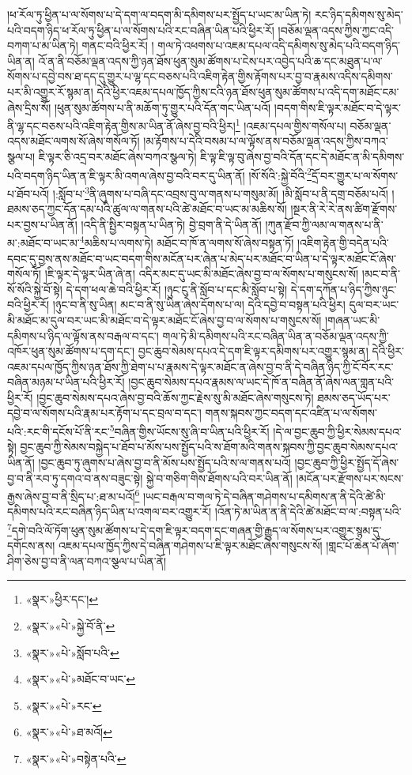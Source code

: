 །ཕ་རོལ་ཏུ་ཕྱིན་པ་ལ་སོགས་པ་དེ་དག་ལ་བདག་མི་དམིགས་པར་སྤྱོད་པ་ཡང་མ་ཡིན་ཏེ། རང་ཉིད་དམིགས་སུ་མེད་པའི་བདག་ཉིད་ཕ་རོལ་ཏུ་ཕྱིན་པ་ལ་སོགས་པའི་རང་བཞིན་ཡིན་པའི་ཕྱིར་རོ། །བཅོམ་ལྡན་འདས་ཀྱིས་ཀྱང་འདི་བཀག་པ་མ་ཡིན་ཏེ། གནང་བའི་ཕྱིར་རོ། །
གལ་ཏེ་འཕགས་པ་འཇམ་དཔལ་འདི་དམིགས་སུ་མེད་པའི་བདག་ཉིད་ཡིན་ན། འོ་ན་ནི་བཅོམ་ལྡན་འདས་ཀྱི་ཉན་ཐོས་ཕུན་སུམ་ཚོགས་པ་ངེས་པར་འབྱེད་པའི་ཆ་དང་མཐུན་པ་ལ་སོགས་པ་དབྱེ་བས་ཐ་དད་དུ་གྱུར་པ་ལྷ་དང་བཅས་པའི་འཇིག་རྟེན་གྱིས་རྟོགས་པར་བྱ་བ་རྣམས་འདིས་དམིགས་པར་མི་འགྱུར་རོ་སྙམ་ན། དེའི་ཕྱིར་འཇམ་དཔལ་ཁྱོད་ཀྱིས་ངའི་ཉན་ཐོས་ཕུན་སུམ་ཚོགས་པ་འདི་དག་མཐོང་ངམ་ཞེས་དྲིས་སོ། །ཕུན་སུམ་ཚོགས་པ་ནི་མཆོག་ཏུ་གྱུར་པའི་དོན་གང་ཡིན་པའོ། །བདག་གིས་ཇི་ལྟར་མཐོང་བ་དེ་ལྟར་ནི་ལྷ་དང་བཅས་པའི་འཇིག་རྟེན་གྱིས་མ་ཡིན་ནོ་ཞེས་བྱ་བའི་ཕྱིར།\footnote{«སྣར་»ཕྱིར་དང་།} །འཇམ་དཔལ་གྱིས་གསོལ་པ། བཅོམ་ལྡན་འདས་མཐོང་ལགས་སོ་ཞེས་གསོལ་ཏོ། །མ་རྟོགས་པ་དེའི་བསམ་པ་ལ་ལྟོས་ནས་བཅོམ་ལྡན་འདས་ཀྱིས་བཀའ་སྩལ་པ། ཇི་ལྟར་ཅི་འདྲ་བར་མཐོང་ཞེས་བཀའ་སྩལ་ཏེ། ཇི་ལྟ་ཇི་ལྟ་བུ་ཞེས་བྱ་བའི་དོན་དང་དེ་མཐོང་ན་མི་དམིགས་པའི་བདག་ཉིད་ཡིན་ན་ཇི་ལྟར་མི་འགལ་ཞེས་བྱ་བའི་བར་དུ་ཡིན་ནོ། །སོ་སོའི་:སྐྱེ་བོའི་\footnote{«སྣར་»«པེ་»སྐྱེ་བོ་ནི་}དྲོ་བར་གྱུར་པ་ལ་སོགས་པ་ཐོབ་པའོ། །:སློབ་པ་\footnote{«སྣར་»«པེ་»སློབ་པའི་}ནི་ཞུགས་པ་བཞི་དང་འབྲས་བུ་ལ་གནས་པ་གསུམ་མོ། །མི་སློབ་པ་ནི་དགྲ་བཅོམ་པའོ། །ཐམས་ཅད་ཀྱང་དོན་དམ་པའི་ཚུལ་ལ་གནས་པའི་ཚེ་མཐོང་བ་ཡང་མ་མཆིས་སོ། །སྔར་ནི་རེ་རེ་ནས་ཚིག་རྫོགས་པར་བྱས་པ་ཡིན་ནོ། །འདི་ནི་སྤྱིར་བསྟན་པ་ཡིན་ཏེ། བྱེ་བྲག་ནི་དེ་ཡིན་ནོ། །ཀུན་རྫོབ་ཀྱི་ལམ་ལ་གནས་པ་ནི་མ་:མཐོང་བ་ཡང་མ་\footnote{«སྣར་»«པེ་»མཐོང་བ་ཡང་}མཆིས་པ་ལགས་ཏེ། མཐོང་བ་ཁོ་ན་ལགས་སོ་ཞེས་བསྟན་ཏོ། །འཇིག་རྟེན་གྱི་བདེན་པའི་དབང་དུ་བྱས་ནས་མཐོང་བ་ཡང་བདག་གིས་མངོན་པར་ཞེན་པ་མེད་པར་མཐོང་བ་ཡིན་པ་དེ་ལྟར་མཐོང་ངོ་ཞེས་གསོལ་ཏོ། །ཇི་ལྟར་དེ་ལྟར་ཡིན་ཞེ་ན། འདིར་མང་དུ་ཡང་མི་མཐོང་ཞེས་བྱ་བ་ལ་སོགས་པ་གསུངས་སོ། །མང་བ་ནི་སོ་སོའི་སྐྱེ་བོ་སྟེ། དེ་དག་ཕལ་ཆེ་བའི་ཕྱིར་རོ། །ཉུང་ངུ་ནི་སློབ་པ་དང་མི་སློབ་པ་སྟེ། དེ་དག་དཀོན་པ་ཉིད་ཀྱིས་ཉུང་བའི་ཕྱིར་རོ། །ཉུང་བ་ནི་སུ་ཡིན། མང་བ་ནི་སུ་ཡིན་ཞེས་དོགས་པ་ལ། དེའི་དབྱེ་བ་བསྟན་པའི་ཕྱིར། དུལ་བར་ཡང་མི་མཐོང་མ་དུལ་བར་ཡང་མི་མཐོང་བ་དེ་ལྟར་མཐོང་ངོ་ཞེས་བྱ་བ་ལ་སོགས་པ་གསུངས་སོ། །གཞན་ཡང་མི་དམིགས་པ་ཉིད་ལ་ལྟོས་ནས་བརྒལ་བ་དང་། གལ་ཏེ་མི་དམིགས་པའི་རང་བཞིན་ཡིན་ན་བཅོམ་ལྡན་འདས་ཀྱི་འཁོར་ཕུན་སུམ་ཚོགས་པ་དག་དང་། བྱང་ཆུབ་སེམས་དཔའ་དེ་དག་ཇི་ལྟར་དམིགས་པར་འགྱུར་སྙམ་ན། དེའི་ཕྱིར་འཇམ་དཔལ་ཁྱོད་ཀྱིས་ཉན་ཐོས་ཀྱི་ཐེག་པ་པ་རྣམས་དེ་ལྟར་མཐོང་ན་ཞེས་བྱ་བ་ནི་དེ་བཞིན་ཉིད་ཀྱི་ངོ་བོར་རང་བཞིན་མཉམ་པ་ཡིན་པའི་ཕྱིར་རོ། །བྱང་ཆུབ་སེམས་དཔའ་རྣམས་ལ་ཡང་དེ་ཁོ་ན་བཞིན་ནོ་ཞེས་ལན་གླན་པའི་ཕྱིར་རོ། །བྱང་ཆུབ་སེམས་དཔའ་ཞེས་བྱ་བའི་ཆོས་ཀྱང་རྗེས་སུ་མི་མཐོང་ཞེས་གསུངས་ཏེ། ཐམས་ཅད་ཡོད་པར་དབྱེ་བ་ལ་སོགས་པའི་རྣམ་པར་རྟོག་པ་དང་བྲལ་བ་དང་། གནས་སྐབས་ཀྱང་བདག་དང་འཛིན་པ་ལ་སོགས་པའི་:རང་གི་དངོས་པོ་ནི་རང་\footnote{«སྣར་»«པེ་»རང་}བཞིན་གྱིས་ཡོངས་སུ་ཞི་བ་ཡིན་པའི་ཕྱིར་རོ། །དེ་ལ་བྱང་ཆུབ་ཀྱི་ཕྱིར་སེམས་དཔའ་སྟེ། བྱང་ཆུབ་ཀྱི་སེམས་བསྐྱེད་པ་ཐོབ་པ་མོས་པས་སྤྱོད་པའི་ས་ཐོག་མའི་གནས་སྐབས་ཀྱི་བྱང་ཆུབ་སེམས་དཔའ་ཡིན་ནོ། །བྱང་ཆུབ་ཏུ་ཞུགས་པ་ཞེས་བྱ་བ་ནི་མོས་པས་སྤྱོད་པའི་ས་ལ་གནས་པའོ། །བྱང་ཆུབ་ཀྱི་ཕྱིར་སྤྱོད་དོ་ཞེས་བྱ་བ་ནི་རབ་ཏུ་དགའ་བ་ནས་བཟུང་སྟེ། སྐྱེ་བ་གཅིག་གིས་ཐོགས་པའི་བར་ཡིན་ནོ། །མངོན་པར་རྫོགས་པར་སངས་རྒྱས་ཞེས་བྱ་བ་ནི་སྲིད་པ་:ཐ་མ་པའོ།\footnote{«སྣར་»«པེ་»ཐ་མའོ།} །ཡང་བརྒལ་བ་གལ་ཏེ་དེ་བཞིན་གཤེགས་པ་དམིགས་ན་ནི་དེའི་ཚེ་མི་དམིགས་པའི་རང་བཞིན་ཉིད་ཡིན་པ་འགལ་བར་འགྱུར་རོ། །འོན་ཏེ་མ་ཡིན་ན་ནི་དེའི་ཚེ་མཐོང་བ་ལ་:བསྟན་པའི་\footnote{«སྣར་»«པེ་»བསྟེན་པའི་}དགེ་བའི་ལོ་ཏོག་ཕུན་སུམ་ཚོགས་པ་དེ་དག་ཇི་ལྟར་བདག་དང་གཞན་གྱི་རྒྱུད་ལ་སོགས་པར་འགྱུར་སྙམ་དུ་དགོངས་ནས། འཇམ་དཔལ་ཁྱོད་ཀྱིས་དེ་བཞིན་གཤེགས་པ་ཇི་ལྟར་མཐོང་ཞེས་གསུངས་སོ། །གླང་པོ་ཆེན་པོ་ཞོག་ཤིག་ཅེས་བྱ་བ་ནི་ལན་བཀའ་སྩལ་པ་ཡིན་ནོ། 